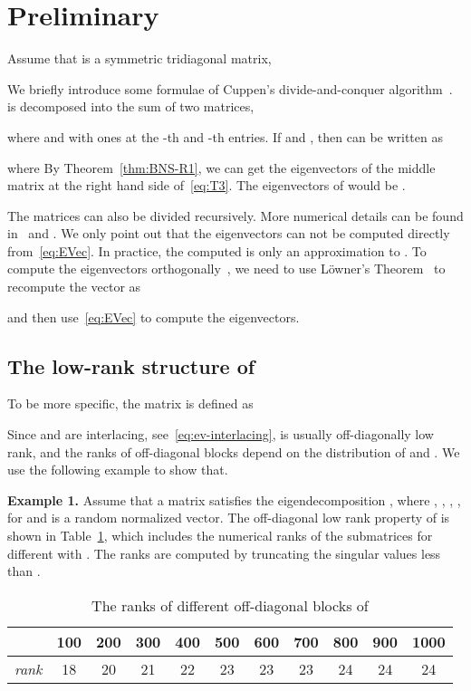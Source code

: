 \documentclass[times]{nlaauth}
\newcounter{algorithm}
\begin{document}
\section{Preliminary}
\label{sec:notation}

Assume that  is a symmetric tridiagonal matrix,

We briefly introduce some formulae of Cuppen's divide-and-conquer
algorithm~\cite{Cuppen81,Rutter94}.
 is decomposed into the sum of two matrices,

where  and  with
ones at the -th and -th entries.
If  and , then  can be written as

where 
By Theorem~\ref{thm:BNS-R1}, we can get the eigenvectors  of the middle
matrix at the right hand side of~\eqref{eq:T3}.
The eigenvectors of  would be .

The matrices  can also be divided recursively.
More numerical details can be found in~\cite{Rutter94} and \cite{Demmel-book}. We only point
out that the eigenvectors can not be computed directly from~\eqref{eq:EVec}.
In practice, the computed  is only an approximation to .
To compute the eigenvectors orthogonally~\cite{Gu-eigenvalue,Gu-rank1},
we need to use L\"{o}wner's Theorem~\cite{lowner} to recompute the vector  as

and then use~\eqref{eq:EVec} to compute the eigenvectors.

\subsection{The low-rank structure of }
\label{sec:lowrank}

 To be more specific, the matrix  is defined as
 
Since  and  are interlacing, see~\eqref{eq:ev-interlacing},  is usually
off-diagonally low rank, and the ranks of off-diagonal blocks depend on the distribution of  and .
We use the following example to show that.

{\bf Example 1.}
Assume that a matrix  satisfies the eigendecomposition ,
where , , , ,
for  and
 is a random normalized vector.
The off-diagonal low rank property of  is shown in Table~\ref{tab:Ex1-rank},
which includes the numerical ranks of the submatrices  for different  with .
The ranks are computed by truncating the singular values less than .

\begin{table}[ptbh]
\caption{The ranks of different off-diagonal blocks of }
\label{tab:Ex1-rank}
\begin{center}
\begin{tabular}[c]{|c|cccccccccc|} \hline
 & 100 & 200 & 300 & 400 & 500 & 600 & 700 & 800 & 900 & 1000 \\ \hline
\emph{rank} & 18 & 20 & 21 & 22 & 23 & 23 & 23 & 24 & 24 & 24  \\ \hline
\end{tabular}
\end{center}
\end{table}
\end{document}
